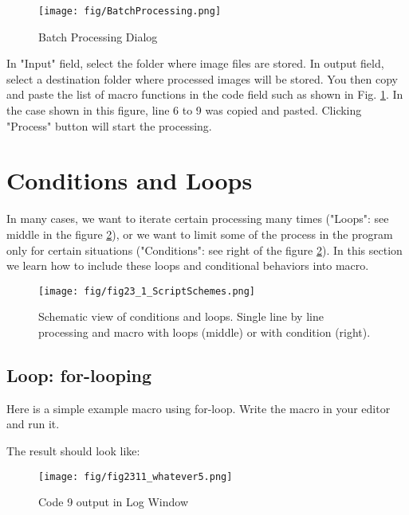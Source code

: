\documentclass[11pt,a4paper,oneside]{report}
\begin{document}
\begin{figure}[htbp]
\begin{center}
\texttt{[image: fig/BatchProcessing.png]}
\caption{Batch Processing Dialog} \label{fig_BatchProcessInterface}
\end{center}
\end{figure}

In "Input" field, select the folder where image files are stored. 
In output field, select a destination folder where processed images will be stored. 
You then copy and paste the list of macro functions in the code field such as 
shown in Fig. \ref{fig_BatchProcessInterface}. 
In the case shown in this figure, line 6 to 9 was copied and pasted. 
Clicking "Process" button will start the processing.
\newpage

\section{Conditions and Loops}
In many cases, we want to iterate certain processing many times ("Loops": see middle in the figure \ref{fig_scriptscheme}), or we want to limit some of the process in the program only for certain situations ("Conditions": see right of the figure \ref{fig_scriptscheme}). In this section we learn how to include these loops and conditional behaviors into macro. 

\begin{figure}[htbp]
\begin{center}
\texttt{[image: fig/fig23\_1\_ScriptSchemes.png]}
\caption{Schematic view of conditions and loops. Single line by line processing and macro with loops (middle) or with condition (right).} \label{fig_scriptscheme}
\end{center}
\end{figure}

\subsection{Loop: for-looping}
Here is a simple example macro using for-loop. Write the macro in your editor and run it. 

The result should look like:

\begin{figure}[htbp]
\begin{center}
\texttt{[image: fig/fig2311\_whatever5.png]}
\caption{Code 9 output in Log Window}
\label{fig_whateverOut}
\end{center}
\end{figure}
\end{document}

